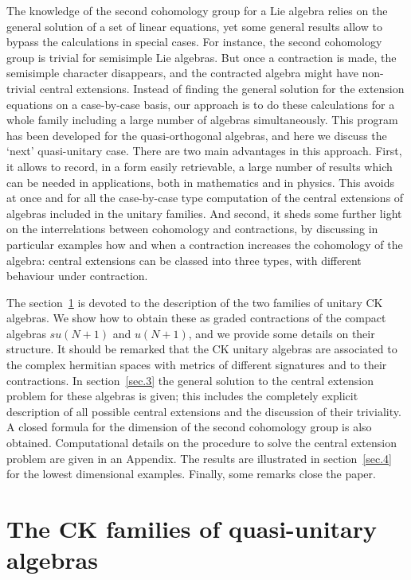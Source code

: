 \documentclass[12pt]{article}
\begin{document}
The knowledge of the second cohomology
group for a Lie algebra relies on the general solution of a set of linear
equations, yet some general results allow to bypass the calculations in
special cases. For instance, the second cohomology group is trivial for
semisimple Lie algebras. But once a contraction is made, the semisimple
character disappears, and the contracted algebra might have non-trivial central
extensions. Instead of finding the general solution for the extension equations
on a case-by-case basis, our approach is to do these calculations for a
whole family including a large number of algebras simultaneously. This program
has been developed for the quasi-orthogonal algebras, and here we discuss the
`next' quasi-unitary case. There are two main advantages in this approach.
First, it allows to record, in a form easily retrievable, a large number of
results which can be needed in applications, both in mathematics and in
physics. This avoids at once and for all the case-by-case type computation of
the
central extensions of algebras included in the unitary families. And second, it
sheds some further light on the interrelations between cohomology and
contractions, by discussing in particular examples how and when a contraction
increases the cohomology of the algebra: central extensions can be classed into
three types, with different behaviour under contraction.

The section~\ref{sec.2} is devoted to the description of the  two families of
unitary CK algebras. We show how to obtain these as graded contractions of the
compact algebras $su(N+1)$ and
$u(N+1)$, and we provide some details on their structure. It should be remarked
that the CK unitary algebras are associated to the complex hermitian spaces
with metrics of different signatures and to their contractions. In
section~\ref{sec.3} the general solution to the central extension problem for
these algebras is given; this includes the completely explicit description of
all possible central extensions and the discussion of their triviality. A
closed formula for the dimension of the second cohomology group is also
obtained. Computational details on the procedure to
solve the central extension problem are given in an Appendix. The results are
illustrated in section~\ref{sec.4} for the lowest dimensional examples.
Finally, some remarks close the paper.

\section{The CK families of quasi-unitary algebras}
\label{sec.2}
\end{document}
